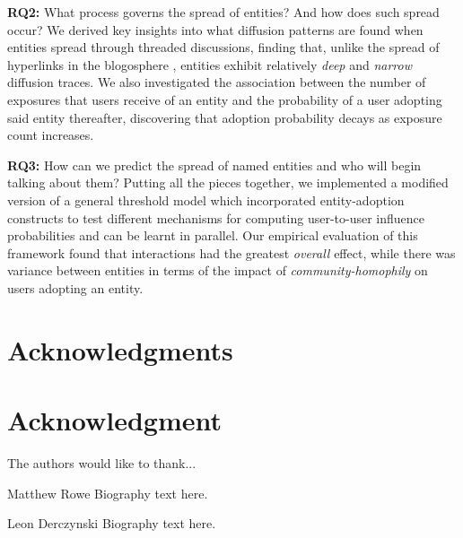 \documentclass[10pt,journal,compsoc]{IEEEtran}
\begin{document}
 \textbf{RQ2:} What process governs the spread of entities? And how does such spread occur?
We derived key insights into what diffusion patterns are found when entities spread through threaded discussions,  finding that, unlike the spread of hyperlinks in the blogosphere \cite{leskovec2007patterns}, entities exhibit relatively \emph{deep} and \emph{narrow} diffusion traces.
We also investigated the association between the number of exposures that users receive of an entity and the probability of a user adopting said entity thereafter, discovering that adoption probability decays as exposure count increases.

 \textbf{RQ3:} How can we predict the spread of named entities and who will begin talking about them?	
Putting all the pieces together, we implemented a modified version of a general threshold model which incorporated entity-adoption constructs to test different mechanisms for computing user-to-user influence probabilities and can be learnt in parallel.
Our empirical evaluation of this framework found that interactions had the greatest \emph{overall} effect, while there was variance between entities in terms of the impact of \emph{community-homophily} on users adopting an entity.

\ifCLASSOPTIONcompsoc
  \section*{Acknowledgments}
\else
  \section*{Acknowledgment}
\fi
The authors would like to thank...






\begin{IEEEbiography}{Matthew Rowe}
Biography text here.
\end{IEEEbiography}

\begin{IEEEbiography}{Leon Derczynski}
Biography text here.
\end{IEEEbiography}
\end{document}
